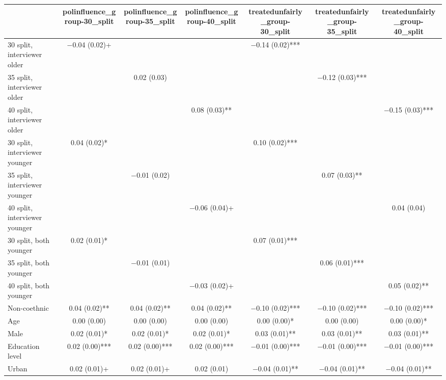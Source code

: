 \begin{table}
\centering
\begin{tabular}[t]{lcccccc}
\toprule
  & polinfluence\_group-30\_split & polinfluence\_group-35\_split & polinfluence\_group-40\_split & treatedunfairly\_group-30\_split & treatedunfairly\_group-35\_split & treatedunfairly\_group-40\_split\\
\midrule
30 split, interviewer older & \num{-0.04} (\num{0.02})+ &  &  & \num{-0.14} (\num{0.02})*** &  & \\
35 split, interviewer older &  & \num{0.02} (\num{0.03}) &  &  & \num{-0.12} (\num{0.03})*** & \\
40 split, interviewer older &  &  & \num{0.08} (\num{0.03})** &  &  & \num{-0.15} (\num{0.03})***\\
30 split, interviewer younger & \num{0.04} (\num{0.02})* &  &  & \num{0.10} (\num{0.02})*** &  & \\
35 split, interviewer younger &  & \num{-0.01} (\num{0.02}) &  &  & \num{0.07} (\num{0.03})** & \\
40 split, interviewer younger &  &  & \num{-0.06} (\num{0.04})+ &  &  & \num{0.04} (\num{0.04})\\
30 split, both younger & \num{0.02} (\num{0.01})* &  &  & \num{0.07} (\num{0.01})*** &  & \\
35 split, both younger &  & \num{-0.01} (\num{0.01}) &  &  & \num{0.06} (\num{0.01})*** & \\
40 split, both younger &  &  & \num{-0.03} (\num{0.02})+ &  &  & \num{0.05} (\num{0.02})**\\
Non-coethnic & \num{0.04} (\num{0.02})** & \num{0.04} (\num{0.02})** & \num{0.04} (\num{0.02})** & \num{-0.10} (\num{0.02})*** & \num{-0.10} (\num{0.02})*** & \num{-0.10} (\num{0.02})***\\
Age & \num{0.00} (\num{0.00}) & \num{0.00} (\num{0.00}) & \num{0.00} (\num{0.00}) & \num{0.00} (\num{0.00})* & \num{0.00} (\num{0.00}) & \num{0.00} (\num{0.00})*\\
Male & \num{0.02} (\num{0.01})* & \num{0.02} (\num{0.01})* & \num{0.02} (\num{0.01})* & \num{0.03} (\num{0.01})** & \num{0.03} (\num{0.01})** & \num{0.03} (\num{0.01})**\\
Education level & \num{0.02} (\num{0.00})*** & \num{0.02} (\num{0.00})*** & \num{0.02} (\num{0.00})*** & \num{-0.01} (\num{0.00})*** & \num{-0.01} (\num{0.00})*** & \num{-0.01} (\num{0.00})***\\
Urban & \num{0.02} (\num{0.01})+ & \num{0.02} (\num{0.01})+ & \num{0.02} (\num{0.01}) & \num{-0.04} (\num{0.01})** & \num{-0.04} (\num{0.01})** & \num{-0.04} (\num{0.01})**\\

\end{tabular}
\end{table}
